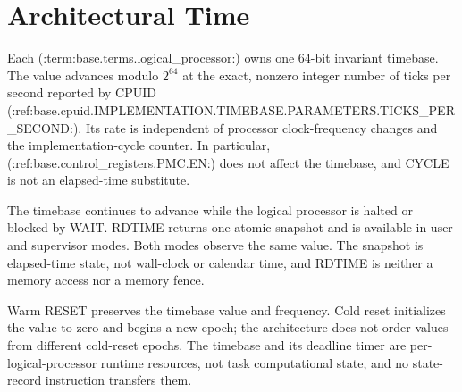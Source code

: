 \section{Architectural Time}\label{page:architectural-time}
Each (:term:base.terms.logical_processor:) owns one 64-bit invariant timebase. The value advances modulo $2^{64}$
at the exact, nonzero integer number of ticks per second reported by CPUID
(:ref:base.cpuid.IMPLEMENTATION.TIMEBASE.PARAMETERS.TICKS_PER_SECOND:). Its rate is independent of processor clock-frequency changes and the
implementation-cycle counter. In particular, (:ref:base.control_registers.PMC.EN:) does not affect the timebase, and CYCLE is not an elapsed-time
substitute.

The timebase continues to advance while the logical processor is halted or blocked by WAIT. RDTIME returns one
atomic snapshot and is available in user and supervisor modes. Both modes observe the same value. The snapshot is
elapsed-time state, not wall-clock or calendar time, and RDTIME is neither a memory access nor a memory fence.

Warm RESET preserves the timebase value and frequency. Cold reset initializes the value to zero and begins a new
epoch; the architecture does not order values from different cold-reset epochs. The timebase and its deadline timer
are per-logical-processor runtime resources, not task computational state, and no state-record instruction transfers them.
